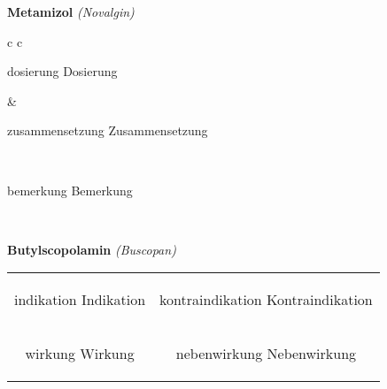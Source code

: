 \documentclass[12pt]{beamer}
\begin{document}
\begin{frame}{
    \textbf{Metamizol}
    \textit{(Novalgin)}
}
    \begin{tabular}{c c}
        \begin{beamercolorbox}[wd=\boxwidth\textwidth,ht=\boxheight\textheight,sep=1em]{dosierung}
        Dosierung
        \end{beamercolorbox} & 
        \begin{beamercolorbox}[wd=\boxwidth\textwidth,ht=\boxheight\textheight,sep=1em]{zusammensetzung}
        Zusammensetzung
        \end{beamercolorbox} \\
        \begin{beamercolorbox}[wd=\textwidth,ht=\boxheight\textheight,sep=1em]{bemerkung}
        Bemerkung
        \end{beamercolorbox} \\
    \end{tabular}
\end{frame}

\begin{frame}{
    \textbf{Butylscopolamin}
    \textit{(Buscopan)}
}
    \begin{tabular}{c c}
        \begin{beamercolorbox}[wd=\boxwidth\textwidth,ht=\boxheight\textheight,sep=1em]{indikation}
        Indikation
        \end{beamercolorbox} & 
        \begin{beamercolorbox}[wd=\boxwidth\textwidth,ht=\boxheight\textheight,sep=1em]{kontraindikation}
        Kontraindikation 
        \end{beamercolorbox} \\
        \begin{beamercolorbox}[wd=\boxwidth\textwidth,ht=\boxheight\textheight,sep=1em]{wirkung}
        Wirkung
        \end{beamercolorbox} & 
        \begin{beamercolorbox}[wd=\boxwidth\textwidth,ht=\boxheight\textheight,sep=1em]{nebenwirkung}
        Nebenwirkung
        \end{beamercolorbox} \\
    \end{tabular}
\end{frame}
\end{document}
